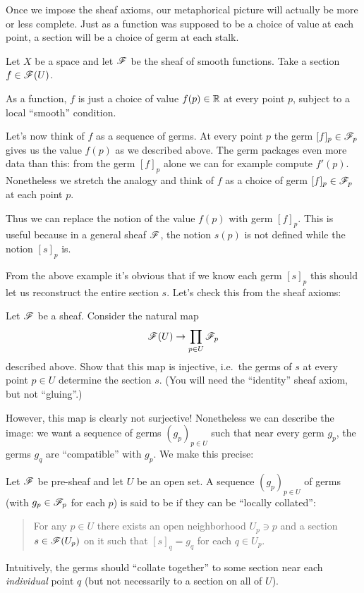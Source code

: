Once we impose the sheaf axioms,
our metaphorical picture will actually be more or less complete.
Just as a function was supposed to be a choice of value at each point,
a section will be a choice of germ at each stalk.

\begin{example}
	Let $X$ be a space and let $\mathscr F$ be the sheaf of smooth functions.
	Take a section $f \in \mathscr F(U)$.
	\begin{itemize}
		\ii As a function, $f$ is just a choice of value $f(p) \in \mathbb R$ at
		every point $p$, subject to a local ``smooth'' condition.

		\ii Let's now think of $f$ as a sequence of germs.
		At every point $p$ the germ $[f]_p \in \mathscr F_p$ gives us the value $f(p)$
		as we described above. The germ packages even more data than this:
		from the germ $[f]_p$ alone we can for example compute $f'(p)$.
		Nonetheless we stretch the analogy and think of $f$
		as a choice of germ $[f]_p \in \mathscr F_p$ at each point $p$.
	\end{itemize}
	Thus we can replace the notion of the value $f(p)$ with germ $[f]_p$.
	This is useful because in a general sheaf $\mathscr F$, the notion $s(p)$
	is not defined while the notion $[s]_p$ is.
\end{example}


From the above example it's obvious that if we know each germ $[s]_p$
this should let us reconstruct the entire section $s$.
Let's check this from the sheaf axioms:
\begin{exercise}
	Let $\mathscr F$ be a sheaf.
	Consider the natural map 
	\[ \mathscr F(U) \to \prod_{p \in U} \mathscr F_p \]
	described above.
	Show that this map is injective, i.e.\
	the germs of $s$ at every point $p \in U$ determine the section $s$.
	(You will need the ``identity'' sheaf axiom, but not ``gluing''.)
\end{exercise}

However, this map is clearly not surjective!
Nonetheless we can describe the image:
we want a sequence of germs $(g_p)_{p \in U}$ such that near every germ $g_p$,
the germs $g_q$ are ``compatible'' with $g_p$.
We make this precise:
\begin{definition}
	Let $\mathscr F$ be pre-sheaf and let $U$ be an open set.
	A sequence $(g_p)_{p \in U}$ of germs
	(with $g_p \in \mathscr F_p$ for each $p$)
	is said to be  if
	they can be ``locally collated'':
	\begin{quote}
		For any $p \in U$ there exists an open neighborhood $U_p \ni p$
		and a section $s \in \mathscr F(U_p)$ on it
		such that $[s]_q = g_q$ for each $q \in U_p$.
	\end{quote}
	Intuitively, the germs should ``collate together'' to some section near
	each \emph{individual} point $q$
	(but not necessarily to a section on all of $U$).
\end{definition}

